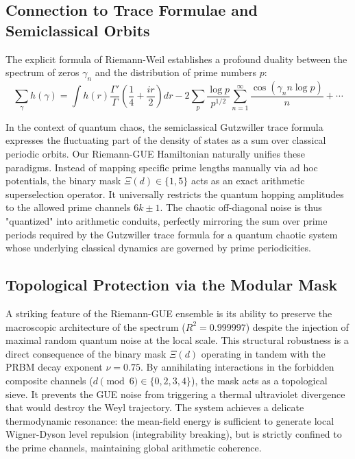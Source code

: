 \documentclass[aps,prl,preprint,superscriptaddress,floatfix]{revtex4-2}
\begin{document}
\subsection{Connection to Trace Formulae and Semiclassical Orbits}

The explicit formula of Riemann-Weil establishes a profound duality between the spectrum of zeros $\gamma_n$ and the distribution of prime numbers $p$:
\begin{equation}
\sum_{\gamma} h(\gamma) = \int h(r) \frac{\Gamma'}{\Gamma}\left(\frac14 + \frac{ir}{2}\right) dr - 2\sum_{p} \frac{\log p}{p^{1/2}} \sum_{n=1}^\infty \frac{\cos(\gamma_n n\log p)}{n} + \cdots
\end{equation}

In the context of quantum chaos, the semiclassical Gutzwiller trace formula expresses the fluctuating part of the density of states as a sum over classical periodic orbits. Our Riemann-GUE Hamiltonian naturally unifies these paradigms. Instead of mapping specific prime lengths manually via ad hoc potentials, the binary mask $\Xi(d) \in \{1,5\}$ acts as an exact arithmetic superselection operator. It universally restricts the quantum hopping amplitudes to the allowed prime channels $6k\pm1$. The chaotic off-diagonal noise is thus "quantized" into arithmetic conduits, perfectly mirroring the sum over prime periods required by the Gutzwiller trace formula for a quantum chaotic system whose underlying classical dynamics are governed by prime periodicities.

\subsection{Topological Protection via the Modular Mask}

A striking feature of the Riemann-GUE ensemble is its ability to preserve the macroscopic architecture of the spectrum ($R^2 = 0.999997$) despite the injection of maximal random quantum noise at the local scale. This structural robustness is a direct consequence of the binary mask $\Xi(d)$ operating in tandem with the PRBM decay exponent $\nu = 0.75$. By annihilating interactions in the forbidden composite channels ($d \pmod 6 \in \{0, 2, 3, 4\}$), the mask acts as a topological sieve. It prevents the GUE noise from triggering a thermal ultraviolet divergence that would destroy the Weyl trajectory. The system achieves a delicate thermodynamic resonance: the mean-field energy is sufficient to generate local Wigner-Dyson level repulsion (integrability breaking), but is strictly confined to the prime channels, maintaining global arithmetic coherence.
\end{document}
